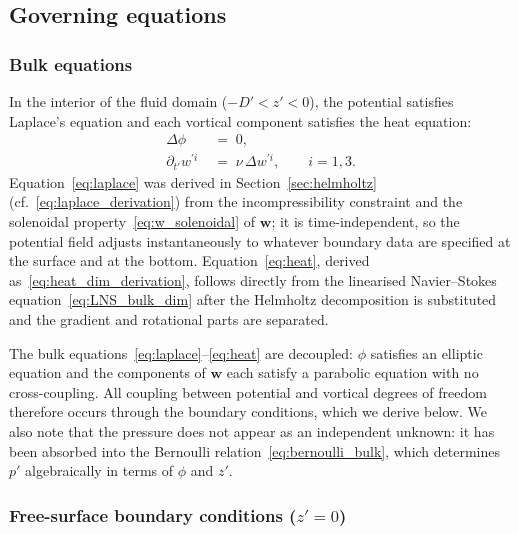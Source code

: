 \documentclass{article}
\newcommand{\ww}{\mathbf{w}}
\begin{document}
\subsection{Governing equations}
\label{sec:governing}

\subsubsection{Bulk equations}

In the interior of the fluid domain ($-D' < z' < 0$), the potential satisfies Laplace's equation and each vortical component satisfies the heat equation:
\begin{align}
    \Delta\phi \;&=\; 0, \label{eq:laplace} \\
    \partial_{t'} w^{\prime i} \;&=\; \nu\, \Delta w^{\prime i}, \qquad i = 1, 3. \label{eq:heat}
\end{align}
\color{black}
Equation~\eqref{eq:laplace} was derived in Section~\ref{sec:helmholtz} (cf.~\eqref{eq:laplace_derivation}) from the incompressibility constraint and the solenoidal property~\eqref{eq:w_solenoidal} of $\ww$; it is time-independent, so the potential field adjusts instantaneously to whatever boundary data are specified at the surface and at the bottom.
Equation~\eqref{eq:heat}, derived as~\eqref{eq:heat_dim_derivation}, follows directly from the linearised Navier--Stokes equation~\eqref{eq:LNS_bulk_dim} after the Helmholtz decomposition is substituted and the gradient and rotational parts are separated.
\color{blue}

The bulk equations~\eqref{eq:laplace}--\eqref{eq:heat} are decoupled: $\phi$ satisfies an elliptic equation and the components of $\ww$ each satisfy a parabolic equation with no cross-coupling.
All coupling between potential and vortical degrees of freedom therefore occurs through the boundary conditions, which we derive below.
We also note that the pressure does not appear as an independent unknown: it has been absorbed into the Bernoulli relation~\eqref{eq:bernoulli_bulk}, which determines $p'$ algebraically in terms of $\phi$ and $z'$.

\subsubsection{Free-surface boundary conditions (\texorpdfstring{$z' = 0$}{z' = 0})}
\label{sec:bc_free_surface}
\end{document}
